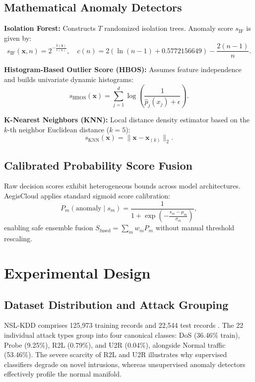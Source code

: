 \documentclass[conference]{IEEEtran}
\begin{document}
\subsection{Mathematical Anomaly Detectors}
\textbf{Isolation Forest:} Constructs $T$ randomized isolation trees. Anomaly score $s_{\mathrm{IF}}$ is given by:
\begin{equation}
s_{\mathrm{IF}}(\mathbf{x}, n) = 2^{-\frac{\bar{h}(\mathbf{x})}{c(n)}}, \quad c(n) = 2\left(\ln(n-1) + 0.5772156649\right) - \frac{2(n-1)}{n}.
\end{equation}

\textbf{Histogram-Based Outlier Score (HBOS):} Assumes feature independence and builds univariate dynamic histograms:
\begin{equation}
s_{\mathrm{HBOS}}(\mathbf{x}) = \sum_{j=1}^{d} \log\left(\frac{1}{\hat{p}_j(x_j) + \epsilon}\right).
\end{equation}

\textbf{K-Nearest Neighbors (KNN):} Local distance density estimator based on the $k$-th neighbor Euclidean distance ($k=5$):
\begin{equation}
s_{\mathrm{KNN}}(\mathbf{x}) = \lVert \mathbf{x} - \mathbf{x}_{(k)} \rVert_2.
\end{equation}

\subsection{Calibrated Probability Score Fusion}
Raw decision scores exhibit heterogeneous bounds across model architectures. AegisCloud applies standard sigmoid score calibration:
\begin{equation}
P_m(\text{anomaly} \mid s_m) = \frac{1}{1 + \exp\left(-\frac{s_m - \mu_m}{\sigma_m}\right)},
\end{equation}
enabling safe ensemble fusion $S_{\mathrm{fused}} = \sum_m w_m P_m$ without manual threshold rescaling.

\section{Experimental Design}
\subsection{Dataset Distribution and Attack Grouping}
NSL-KDD comprises 125,973 training records and 22,544 test records \cite{tavallaee2009detailed}. The 22 individual attack types group into four canonical classes: DoS (36.46\% train), Probe (9.25\%), R2L (0.79\%), and U2R (0.04\%), alongside Normal traffic (53.46\%). The severe scarcity of R2L and U2R illustrates why supervised classifiers degrade on novel intrusions, whereas unsupervised anomaly detectors effectively profile the normal manifold.
\end{document}
